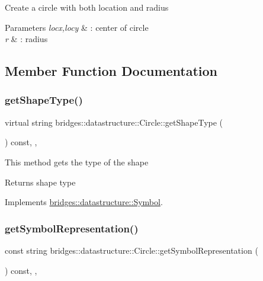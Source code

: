 Create a circle with both location and radius 
\begin{DoxyParams}{Parameters}
{\em locx,locy} & \+: center of circle \\
\hline
{\em r} & \+: radius \\
\hline
\end{DoxyParams}


\subsection{Member Function Documentation}
\mbox{\label{classbridges_1_1datastructure_1_1_circle_aa865c28869b28bbf6416e5a36b7f5102}} 
\subsubsection{\texorpdfstring{get\+Shape\+Type()}{getShapeType()}}
{\footnotesize\ttfamily virtual string bridges\+::datastructure\+::\+Circle\+::get\+Shape\+Type (\begin{DoxyParamCaption}{ }\end{DoxyParamCaption}) const\hspace{0.3cm}{\ttfamily [inline]}, {\ttfamily [override]}, {\ttfamily [virtual]}}

This method gets the type of the shape

\begin{DoxyReturn}{Returns}
shape type 
\end{DoxyReturn}


Implements \hyperlink{classbridges_1_1datastructure_1_1_symbol_a1fb7cabce2915b103b8474658e8549f8}{bridges\+::datastructure\+::\+Symbol}.

\mbox{\label{classbridges_1_1datastructure_1_1_circle_a5b896b2aba1fd468f9ddb3aa3b719fe9}} 
\subsubsection{\texorpdfstring{get\+Symbol\+Representation()}{getSymbolRepresentation()}}
{\footnotesize\ttfamily const string bridges\+::datastructure\+::\+Circle\+::get\+Symbol\+Representation (\begin{DoxyParamCaption}{ }\end{DoxyParamCaption}) const\hspace{0.3cm}{\ttfamily [inline]}, {\ttfamily [override]}, {\ttfamily [virtual]}}

